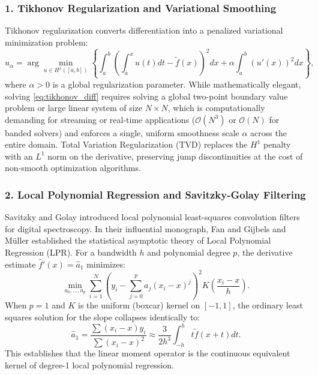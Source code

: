\documentclass[11pt,a4paper]{article}
\theoremstyle{definition}
\begin{document}
\subsubsection{1. Tikhonov Regularization and Variational Smoothing}
Tikhonov regularization \cite{tikhonov1977, groetsch1993, hanke2001} converts differentiation into a penalized variational minimization problem:
\begin{equation}
\hat{u}_\alpha = \arg\min_{u \in H^1([a, b])} \left\{ \int_a^b \left( \int_a^x u(t) dt - \tilde{f}(x) \right)^2 dx + \alpha \int_a^b (u'(x))^2 dx \right\},
\label{eq:tikhonov_diff}
\end{equation}
where $\alpha > 0$ is a global regularization parameter. While mathematically elegant, solving \eqref{eq:tikhonov_diff} requires solving a global two-point boundary value problem or large linear system of size $N \times N$, which is computationally demanding for streaming or real-time applications ($\mathcal{O}(N^3)$ or $\mathcal{O}(N)$ for banded solvers) and enforces a single, uniform smoothness scale $\alpha$ across the entire domain. Total Variation Regularization (TVD) \cite{rudin1992, chartrand2011} replaces the $H^1$ penalty with an $L^1$ norm on the derivative, preserving jump discontinuities at the cost of non-smooth optimization algorithms.

\subsubsection{2. Local Polynomial Regression and Savitzky-Golay Filtering}
Savitzky and Golay \cite{savitzky1964} introduced local polynomial least-squares convolution filters for digital spectroscopy. In their influential monograph, Fan and Gijbels \cite{fan1996} and Müller \cite{muller1984} established the statistical asymptotic theory of Local Polynomial Regression (LPR). For a bandwidth $h$ and polynomial degree $p$, the derivative estimate $\hat{f}'(x) = \hat{a}_1$ minimizes:
\begin{equation}
\min_{a_0, \dots, a_p} \sum_{i=1}^N \left( y_i - \sum_{j=0}^p a_j (x_i - x)^j \right)^2 K\left(\frac{x_i - x}{h}\right).
\end{equation}
When $p = 1$ and $K$ is the uniform (boxcar) kernel on $[-1, 1]$, the ordinary least squares solution for the slope collapses identically to:
\begin{equation}
\hat{a}_1 = \frac{\sum (x_i - x) y_i}{\sum (x_i - x)^2} \approx \frac{3}{2h^3} \int_{-h}^h t \tilde{f}(x + t) dt.
\end{equation}
This establishes that the linear moment operator is the continuous equivalent kernel of degree-1 local polynomial regression.
\end{document}
